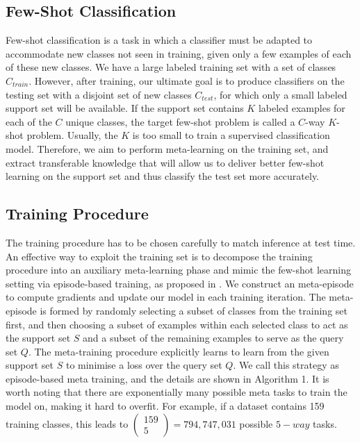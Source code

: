 \documentclass[11pt,a4paper]{article}
\begin{document}
\subsection{Few-Shot Classification}
Few-shot classification \citep{vinyals2016matching,snell2017prototypical} is a task in which a classifier must be adapted to accommodate new classes not seen in training, given only a few examples of each of these new classes. We have a large labeled training set with a set of classes $C_{train}$. However, after training, our ultimate goal is to produce classifiers on the testing set with a disjoint set of new classes $C_{test}$, for which only a small labeled support set will be available. If the support set contains $K$ labeled examples for each of the $C$ unique classes, the target few-shot problem is called a $C$-way $K$-shot problem. Usually, the $K$ is too small to train a supervised classification model. Therefore, we aim to perform meta-learning on the training set, and extract transferable knowledge that will allow us to deliver better few-shot learning on the support set and thus classify the test set more accurately.

\subsection{Training Procedure}
The training procedure has to be chosen carefully to match inference at test time. An effective way to exploit the training set is to decompose the training procedure into an auxiliary meta-learning phase and mimic the few-shot learning setting via episode-based training, as proposed in \citet{vinyals2016matching}. We construct an meta-episode to compute gradients and update our model in each training iteration. The meta-episode is formed by randomly selecting a subset of classes from the training set first, and then choosing a subset of examples within each selected class to act as the support set $S$ and a subset of the remaining examples to serve as the query set $Q$. 
The meta-training procedure explicitly learns to learn from the given support set $S$ to minimise a loss over the query set $Q$. We call this strategy as episode-based meta training, and the details are shown in Algorithm 1.
It is worth noting that there are exponentially many possible meta tasks to train the model on, making it hard to overfit. 
For example, if a dataset contains 159 training classes, this leads to $\left( \begin{array}{cc}
     159  \\
     5 
\end{array}\right)=794,747,031$ possible $5-way$ tasks.\\
\end{document}
